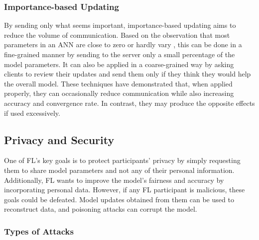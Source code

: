 \subsubsection{Importance-based Updating}
By sending only what seems important, importance-based updating aims to reduce the volume of communication. Based on the observation that most parameters in an ANN are close to zero or hardly vary \cite{observation_parameters}, this can be done in a fine-grained manner by sending to the server only a small percentage of the model parameters. It can also be applied in a coarse-grained way by asking clients to review their updates and send them only if they think they would help the overall model. These techniques have demonstrated that, when applied properly, they can occasionally reduce communication while also increasing accuracy and convergence rate. In contrast, they may produce the opposite effects if used excessively.

\subsection{Privacy and Security}
One of FL's key goals is to protect participants' privacy by simply requesting them to share model parameters and not any of their personal information. Additionally, FL wants to improve the model's fairness and accuracy by incorporating personal data. However, if any FL participant is malicious, these goals could be defeated. Model updates obtained from them can be used to reconstruct data, and poisoning attacks can corrupt the model.

\subsubsection{Types of Attacks} %

